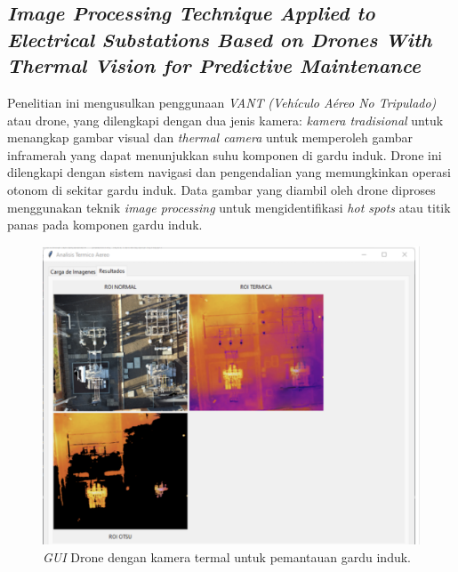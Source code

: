 \subsection{\emph{Image Processing Technique Applied to Electrical
Substations Based on Drones With Thermal Vision
for Predictive Maintenance}}
Penelitian ini mengusulkan penggunaan \emph{VANT} \emph{(Vehículo Aéreo No Tripulado)} atau drone, yang dilengkapi dengan dua jenis kamera: \emph{kamera tradisional} untuk menangkap gambar visual dan \emph{thermal camera} untuk memperoleh gambar inframerah yang dapat menunjukkan suhu komponen di gardu induk. Drone ini dilengkapi dengan sistem navigasi dan pengendalian yang memungkinkan operasi otonom di sekitar gardu induk. Data gambar yang diambil oleh drone diproses menggunakan teknik \emph{image processing} untuk mengidentifikasi \emph{hot spots} atau titik panas pada komponen gardu induk.

\begin{figure}[H]
  \centering
  \includegraphics[scale=0.34]{gambar/bab2/drone.png}
  \caption{\emph{GUI} Drone dengan kamera termal untuk pemantauan gardu induk.}
  \label{fig:Drone dengan kamera termal untuk pemantauan gardu induk}
\end{figure}

